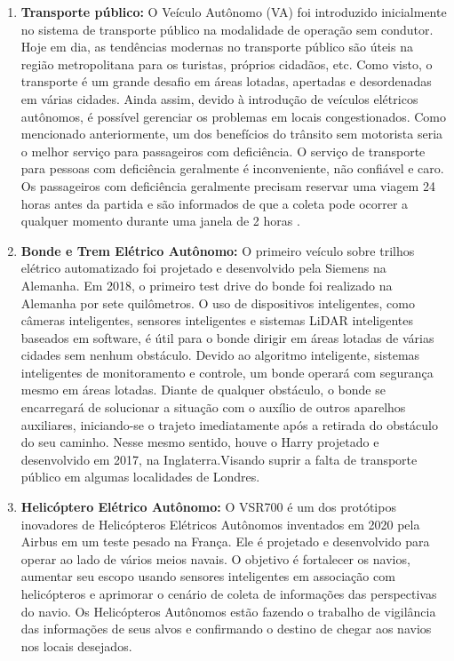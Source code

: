 \begin{enumerate}
 \item \textbf{Transporte público:} O Veículo Autônomo (VA) foi introduzido inicialmente no sistema de transporte público na modalidade de operação sem condutor. Hoje em dia, as tendências modernas no transporte público são úteis na região metropolitana para os turistas, próprios cidadãos, etc. Como visto, o transporte é um grande desafio em áreas lotadas, apertadas e desordenadas em várias cidades. Ainda assim, devido à introdução de veículos elétricos autônomos, é possível gerenciar os problemas em locais congestionados. Como mencionado anteriormente, um dos benefícios do trânsito sem motorista seria o melhor serviço para passageiros com deficiência. O serviço de transporte para pessoas com deficiência geralmente é inconveniente, não confiável e caro. Os passageiros com deficiência geralmente precisam reservar uma viagem 24 horas antes da partida e são informados de que a coleta pode ocorrer a qualquer momento durante uma janela de 2 horas \cite{notif}.
\item \textbf{Bonde e Trem Elétrico Autônomo:} O primeiro veículo sobre trilhos elétrico automatizado foi projetado e desenvolvido pela Siemens na Alemanha. Em 2018, o primeiro test drive do bonde foi realizado na Alemanha por sete quilômetros. O uso de dispositivos inteligentes, como câmeras inteligentes, sensores inteligentes e sistemas LiDAR inteligentes baseados em software, é útil para o bonde dirigir em áreas lotadas de várias cidades sem nenhum obstáculo. Devido ao algoritmo inteligente, sistemas inteligentes de monitoramento e controle, um bonde operará com segurança mesmo em áreas lotadas. Diante de qualquer obstáculo, o bonde se encarregará de solucionar a situação com o auxílio de outros aparelhos auxiliares, iniciando-se o trajeto imediatamente após a retirada do obstáculo do seu caminho. Nesse mesmo sentido, houve o Harry projetado e desenvolvido em 2017, na Inglaterra.Visando suprir a falta de transporte público em algumas localidades de Londres.
\item \textbf{Helicóptero Elétrico Autônomo:} O VSR700 é um dos protótipos inovadores de Helicópteros Elétricos Autônomos inventados em 2020 pela Airbus em um teste pesado na França. Ele é projetado e desenvolvido para operar ao lado de vários meios navais. O objetivo é fortalecer os navios, aumentar seu escopo usando sensores inteligentes em associação com helicópteros e aprimorar o cenário de coleta de informações das perspectivas do navio. Os Helicópteros Autônomos estão fazendo o trabalho de vigilância das informações de seus alvos e confirmando o destino de chegar aos navios nos locais desejados. 

\end{enumerate}
